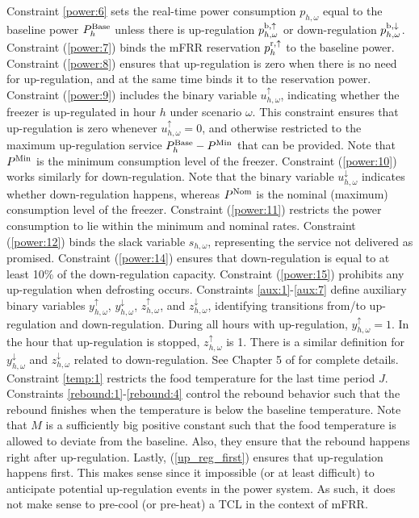 {%
Constraint \eqref{power:6} sets the real-time power consumption $p_{h,\omega}$ equal to the baseline power $P^{\rm{Base}}_{h}$ unless there is up-regulation $p^{\rm{b}, \uparrow}_{h,\omega}$ or down-regulation $p^{\rm{b}, \downarrow}_{h,\omega}$. 
%
Constraint (\ref{power:7}) binds the mFRR reservation $p_{h}^{\rm{r},\uparrow}$ to the baseline power. 
%
Constraint (\ref{power:8}) ensures that up-regulation is zero when there is no need for up-regulation, and at the same time binds it to the reservation power. 
%
Constraint (\ref{power:9}) includes the binary variable $u^{\uparrow}_{h,\omega}$, indicating whether the freezer is up-regulated in hour $h$ under scenario $\omega$. This constraint ensures that up-regulation is zero whenever $u^{\uparrow}_{h,\omega} = 0$, and otherwise restricted to the maximum up-regulation service $P^{\rm{Base}}_{h}-P^{\rm{Min}}$ that can be provided. Note that $P^{\rm{Min}}$ is the minimum consumption level of the freezer. 
%
Constraint (\ref{power:10}) works similarly for down-regulation. Note that the binary variable $u^{\downarrow}_{h,\omega}$ indicates whether down-regulation happens, whereas $P^{\rm{Nom}}$ is the nominal (maximum) consumption level of the freezer. 
%
Constraint (\ref{power:11}) restricts the power consumption to lie within the minimum and nominal rates.
%
Constraint (\ref{power:12}) binds the slack variable $s_{h,\omega}$, representing the service not delivered as promised. 
%
Constraint (\ref{power:14}) ensures that down-regulation is equal to at least 10\% of the down-regulation capacity. 
%
Constraint (\ref{power:15}) prohibits any up-regulation when defrosting occurs.
%
Constraints \eqref{aux:1}-\eqref{aux:7} define auxiliary binary variables $y^{\uparrow}_{h,\omega}$, $y^{\downarrow}_{h,\omega}$, $z^{\uparrow}_{h,\omega}$, and $z^{\downarrow}_{h,\omega}$, identifying transitions from/to up-regulation and down-regulation.
During all hours with up-regulation, $y^{\uparrow}_{h,\omega}=1$. In the hour that up-regulation is stopped, $z^{\uparrow}_{h,\omega}$ is 1. There is a similar definition for $y^{\downarrow}_{h,\omega}$ and $z^{\downarrow}_{h,\omega}$ related to down-regulation. 
See Chapter 5 of  \cite{morales2013integrating} for complete details.
%
Constraint \eqref{temp:1} restricts the food temperature for the last time period $J$.  
%
Constraints \eqref{rebound:1}-\eqref{rebound:4} control the rebound behavior such that the rebound finishes when the temperature is below the baseline temperature. Note that $M$ is a sufficiently big positive constant such that the food temperature is allowed to deviate from the baseline. Also, they ensure that the rebound happens right after up-regulation.
%
Lastly, (\ref{up_reg_first}) ensures that up-regulation happens first. This makes sense since it impossible (or at least difficult) to anticipate potential up-regulation events in the power system. As such, it does not make sense to pre-cool (or pre-heat) a TCL in the context of mFRR.

}
